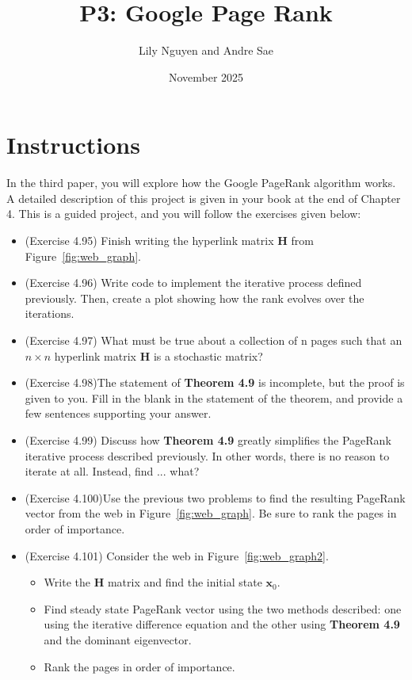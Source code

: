 \documentclass{article}
\title{P3: Google Page Rank}
\author{Lily Nguyen and Andre Sae}
\date{November 2025}
\begin{document}
\maketitle

\section{Instructions}

In the third paper, you will explore how the Google PageRank algorithm works. A detailed description of this project is given in your book at the end of Chapter 4. This is a guided project, and you will follow the exercises given below:

\begin{itemize}
    \item (Exercise 4.95) Finish writing the hyperlink matrix $\boldsymbol{H}$ from Figure~\ref{fig:web_graph}.
    \item (Exercise 4.96) Write code to implement the iterative process defined previously. Then, create a plot showing how the rank evolves over the iterations.
    \item (Exercise 4.97) What must be true about a collection of n pages such that an $n\times n$ hyperlink matrix $\boldsymbol{H}$ is a stochastic matrix?
    \item (Exercise 4.98)The statement of \textbf{Theorem 4.9} is incomplete, but the proof is given to you. Fill in the blank in the statement of the theorem, and provide a few sentences supporting your answer.
    \item (Exercise 4.99) Discuss how \textbf{Theorem 4.9} greatly simplifies the PageRank iterative process described previously. In other words, there is no reason to iterate at all. Instead, find ... what?
    \item (Exercise 4.100)Use the previous two problems to find the resulting PageRank vector from the web in Figure~\ref{fig:web_graph}. Be sure to rank the pages in order of importance. 
    \item (Exercise 4.101) Consider the web in Figure~\ref{fig:web_graph2}.
    \begin{itemize}
        \item Write the $\boldsymbol{H}$ matrix and find the initial state $\boldsymbol{x}_0$.
        \item Find steady state PageRank vector using the two methods described: one using the iterative difference equation and the other using \textbf{Theorem 4.9} and the dominant eigenvector.
        \item Rank the pages in order of importance.
    \end{itemize}
\end{itemize}
\end{document}
